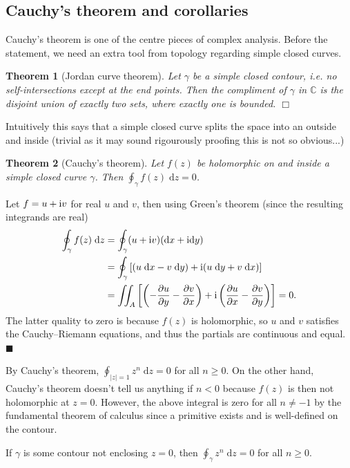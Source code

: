 \documentclass[letter-paper]{tufte-book}
\newtheorem{theorem}{\color{pastel-blue}Theorem}[section]
\newenvironment{proof}[1][Proof]{\begin{trivlist}
\item[\hskip \labelsep {\bfseries #1}]}{\end{trivlist}}
\newenvironment{example}[1][Example]{\begin{trivlist}
\item[\hskip \labelsep {\bfseries #1}]}{\end{trivlist}}
\newcommand{\dy}{\partial}
\newcommand{\ddy}[2]{\frac{\dy#1}{\dy#2}}
\newcommand{\zi}{{\rm i}}
\newcommand{\qed}{\hfill$\blacksquare$}
\newcommand{\qedwhite}{\hfill \ensuremath{\Box}}
\begin{document}

\subsection{Cauchy's theorem and corollaries}

Cauchy's theorem is one of the centre pieces of complex analysis. Before the
statement, we need an extra tool from topology regarding simple closed curves.

\begin{theorem}[Jordan curve theorem]
  Let $\gamma$ be a simple closed contour, i.e. no self-intersections except at
  the end points. Then the compliment of $\gamma$ in $\mathbb{C}$ is the
  disjoint union of exactly two sets, where exactly one is bounded. \qedwhite
\end{theorem}

Intuitively this says that a simple closed curve splits the space into an
outside and inside (trivial as it may sound rigourously proofing this is not so
obvious...)

\begin{theorem}[Cauchy's theorem]
  Let $f(z)$ be holomorphic on and inside a simple closed curve $\gamma$. Then
  $\oint_\gamma f(z)\; \mathrm{d}z = 0$.
\end{theorem}

\begin{proof}
  Let $f = u + \zi v$ for real $u$ and $v$, then using Green's theorem (since
  the resulting integrands are real)
  \begin{align*}
    \oint_\gamma f(z)\; \mathrm{d}z &= \oint_\gamma (u + \zi v)(\mathrm{d}x + \zi \mathrm{d}y) \\
      &= \oint_\gamma \left[(u\; \mathrm{d}x - v\; \mathrm{d}y) + \zi(u\; \mathrm{d}y + v\; \mathrm{d}x) \right]\\
      &= \iint_A \left[\left(-\ddy{u}{y} -\ddy{v}{x}\right) + \zi \left(\ddy{u}{x} - \ddy{v}{y}\right)\right] = 0.
  \end{align*}
  The latter quality to zero is because $f(z)$ is holomorphic, so $u$ and $v$
  satisfies the Cauchy--Riemann equations, and thus the partials are continuous
  and equal. \qed
\end{proof}

\begin{example}
By Cauchy's theorem, $\oint_{|z| = 1} z^n\; \mathrm{d}z = 0$ for all $n \geq 0$.
On the other hand, Cauchy's theorem doesn't tell us anything if $n < 0$ because
$f(z)$ is then not holomorphic at $z=0$. However, the above integral is zero for
all $n \neq -1$ by the fundamental theorem of calculus since a primitive exists
and is well-defined on the contour.

If $\gamma$ is some contour not enclosing $z = 0$, then $\oint_\gamma z^n\;
\mathrm{d}z = 0$ for all $n \geq 0$.
\end{example}
\end{document}
